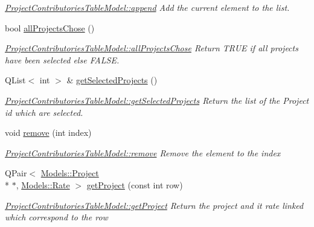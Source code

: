 \begin{DoxyCompactItemize}
\begin{DoxyCompactList}\small\item\em \hyperlink{classGui_1_1Widgets_1_1WdgModels_1_1ProjectContributoriesTableModel_a7bb1cd1299d72ce4d6a35cc38bff5a70}{Project\-Contributories\-Table\-Model\-::append} Add the current element to the list. \end{DoxyCompactList}\item 
bool \hyperlink{classGui_1_1Widgets_1_1WdgModels_1_1ProjectContributoriesTableModel_a700d8e8e545e3d048d3d5aa78467e7eb}{all\-Projects\-Chose} ()
\begin{DoxyCompactList}\small\item\em \hyperlink{classGui_1_1Widgets_1_1WdgModels_1_1ProjectContributoriesTableModel_a700d8e8e545e3d048d3d5aa78467e7eb}{Project\-Contributories\-Table\-Model\-::all\-Projects\-Chose} Return T\-R\-U\-E if all projects have been selected else F\-A\-L\-S\-E. \end{DoxyCompactList}\item 
Q\-List$<$ int $>$ \& \hyperlink{classGui_1_1Widgets_1_1WdgModels_1_1ProjectContributoriesTableModel_ab32f6d5b6e708b08cce0a83411f1eedc}{get\-Selected\-Projects} ()
\begin{DoxyCompactList}\small\item\em \hyperlink{classGui_1_1Widgets_1_1WdgModels_1_1ProjectContributoriesTableModel_ab32f6d5b6e708b08cce0a83411f1eedc}{Project\-Contributories\-Table\-Model\-::get\-Selected\-Projects} Return the list of the Project id which are selected. \end{DoxyCompactList}\item 
void \hyperlink{classGui_1_1Widgets_1_1WdgModels_1_1ProjectContributoriesTableModel_ae142b64f61cf2337cf3fcb3d6ce291ec}{remove} (int index)
\begin{DoxyCompactList}\small\item\em \hyperlink{classGui_1_1Widgets_1_1WdgModels_1_1ProjectContributoriesTableModel_ae142b64f61cf2337cf3fcb3d6ce291ec}{Project\-Contributories\-Table\-Model\-::remove} Remove the element to the {\itshape index} \end{DoxyCompactList}\item 
Q\-Pair$<$ \hyperlink{classModels_1_1Project}{Models\-::\-Project} \\*
$\ast$, \hyperlink{classModels_1_1Rate}{Models\-::\-Rate} $>$ \hyperlink{classGui_1_1Widgets_1_1WdgModels_1_1ProjectContributoriesTableModel_af44a062f618d9c8b095bdb5170c1403b}{get\-Project} (const int row)
\begin{DoxyCompactList}\small\item\em \hyperlink{classGui_1_1Widgets_1_1WdgModels_1_1ProjectContributoriesTableModel_af44a062f618d9c8b095bdb5170c1403b}{Project\-Contributories\-Table\-Model\-::get\-Project} Return the project and it rate linked which correspond to the {\itshape row} \end{DoxyCompactList}\item 

\end{DoxyCompactItemize}
